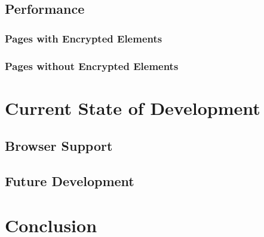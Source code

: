 \section{Performance}
\subsection{Pages with Encrypted Elements}
\subsection{Pages without Encrypted Elements}

\chapter{Current State of Development} %
\section{Browser Support}
\section{Future Development}

\chapter{Conclusion}
